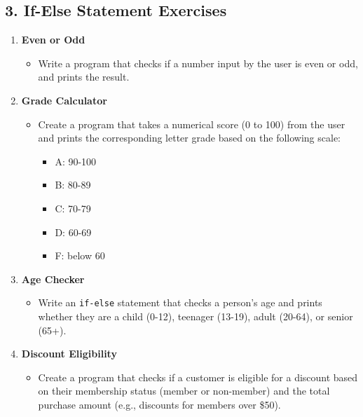 \documentclass[10pt]{book}
\begin{document}
\subsection*{3. If-Else Statement Exercises}

\begin{enumerate}
    \item \textbf{Even or Odd}
    \begin{itemize}
        \item Write a program that checks if a number input by the user is even or odd, and prints the result.
    \end{itemize}

    \item \textbf{Grade Calculator}
    \begin{itemize}
        \item Create a program that takes a numerical score (0 to 100) from the user and prints the corresponding letter grade based on the following scale:
        \begin{itemize}
            \item A: 90-100
            \item B: 80-89
            \item C: 70-79
            \item D: 60-69
            \item F: below 60
        \end{itemize}
    \end{itemize}

    \item \textbf{Age Checker}
    \begin{itemize}
        \item Write an \texttt{if-else} statement that checks a person's age and prints whether they are a child (0-12), teenager (13-19), adult (20-64), or senior (65+).
    \end{itemize}

    \item \textbf{Discount Eligibility}
    \begin{itemize}
        \item Create a program that checks if a customer is eligible for a discount based on their membership status (member or non-member) and the total purchase amount (e.g., discounts for members over \$50).
    \end{itemize}


\end{enumerate}
\end{document}
